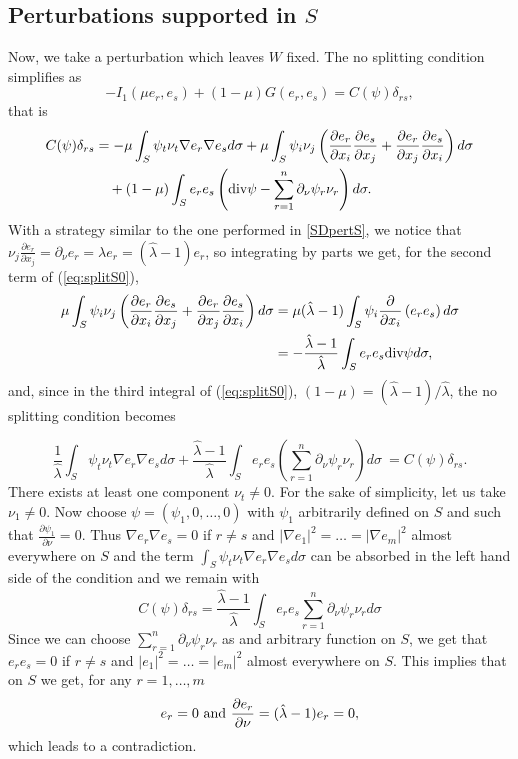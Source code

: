 \documentclass[a4paper,reqno,11pt,oneside]{amsart}
\theoremstyle{plain}
\theoremstyle{plain}
\theoremstyle{plain}
\theoremstyle{remark}
\def\div{\textup{div}}
\begin{document}
\subsection{Perturbations supported in $S$}\label{sec:Sneumann}

Now, we take a perturbation which leaves $W$ fixed. The no splitting condition simplifies as
$$
    -I_1(  \mu e_r,e_s)+(1-\mu) G( e_r, e_s)
=C(\psi)\delta_{rs}, 
$$
that is
 \begin{equation} \begin{aligned}\label{eq:splitS0}
 C(\psi)\delta_{rs}  &= - \mu\int_{S}\psi_t\nu_t\nabla e_r\nabla e_s d\sigma
    + \mu \int_{S}
\psi_i\nu_j \left(\frac{\partial e_r}{\partial x_i}\frac{\partial e_s}{\partial x_j}+\frac{\partial e_r}{\partial x_j}\frac{\partial e_s}{\partial x_i}
\right) d\sigma\\ &\quad
+(1-\mu)  \int_{S}e_r e_s \left(\div \psi -\sum_{r=1}^n \partial_\nu \psi_r \nu_r\right)d\sigma.\end{aligned}
 \end{equation}
With a strategy similar to the one performed in \ref{SDpertS}, we notice that  $\nu_j\frac{\partial e_r}{\partial x_j}=\partial_\nu e_r=\lambda e_r=(\hat \lambda-1) e_r$, so integrating by parts we get, for the second term of (\ref{eq:splitS0}), 
$$\begin{aligned}
    \mu \int_{S}
\psi_i\nu_j \left(\frac{\partial e_r}{\partial x_i}\frac{\partial e_s}{\partial x_j}+\frac{\partial e_r}{\partial x_j}\frac{\partial e_s}{\partial x_i}
\right) d\sigma&=
\mu(\hat \lambda-1) \int_{S}
\psi_i\frac{\partial }{\partial x_i}\left(e_r e_s
\right) d\sigma\\ &=-\frac{ \hat \lambda-1} {\hat \lambda }
\int_{S}
e_r e_s\div\psi
 d\sigma,
\end{aligned}$$
and, since in the third integral of (\ref{eq:splitS0}), $(1-\mu)=( \hat \lambda-1)/{ \hat \lambda}$, the no splitting condition becomes

$$     \frac 1{ \hat \lambda}\int_{S}\psi_t\nu_t\nabla e_r\nabla e_s d\sigma
+\frac{ \hat \lambda-1}{ \hat \lambda}   \int_{S}e_r e_s \left(\sum_{r=1}^n \partial_\nu \psi_r \nu_r\right)d\sigma \ =
C(\psi)\delta_{rs}.
$$
There exists at least one component $\nu_t \neq 0$. For the sake of simplicity, let us take $\nu_1\neq 0$.
Now choose $\psi=(\psi_1,0,\dots,0)$ with $\psi_1$ arbitrarily defined on $S$ and such that $\frac{\partial \psi_1} {\partial \nu}=0$. Thus  $\nabla e_r \nabla e_s=0$ if $r\neq s$ and $|\nabla e_1|^2=\dots=|\nabla e_m|^2$ almost everywhere on $S$ and the term $\int_{S}\psi_t\nu_t \nabla e_r\nabla e_s d\sigma$ can be absorbed in the left hand side of the condition and we remain with
$$
     C(\psi)\delta_{rs}=
     \frac{ \hat \lambda-1}{ \hat \lambda} \int_{ S}  e_r  e_s\sum_{r=1}^n \partial_\nu \psi_r \nu_r d\sigma
$$
Since we can choose $\sum_{r=1}^n \partial_\nu \psi_r \nu_r $ as and arbitrary function on $S$, we get that $ e_r  e_s=0$ if $r\neq s$ and $| e_1|^2=\dots=| e_m|^2$ almost everywhere on $S$. This implies that on $S$ we get, for any $r=1,\dots, m$
$$
    e_r=0\ \hbox{and}\ \frac{\partial e_r}{\partial \nu}=( \hat \lambda-1) e_r=0
,$$
which leads to a contradiction.
\end{document}
